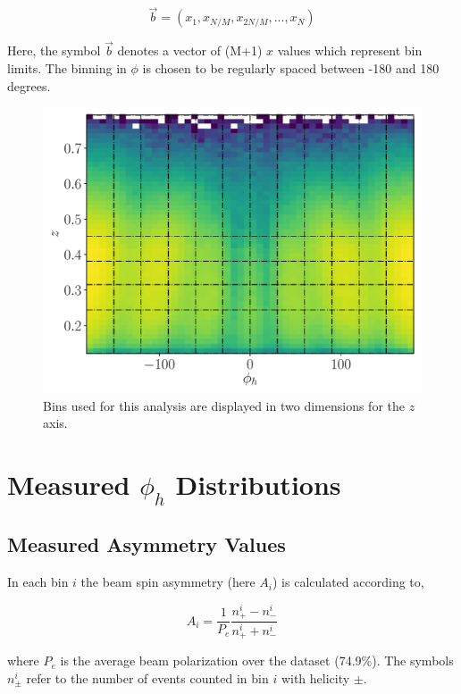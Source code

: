 \begin{equation}
  \vec{b} = (x_1, x_{N/M}, x_{2N/M}, ..., x_N)
\end{equation}

Here, the symbol $\vec{b}$ denotes a vector of (M+1) $x$ values which represent bin limits.  The binning in $\phi$ is chosen to be regularly spaced between -180 and 180 degrees.    

\begin{figure}
	\centering
	\label{fig:binning-z-phi}
	\includegraphics[width = 12cm]{image/plots/kaon-bsa/binning_z_phi.pdf}
	\caption{Bins used for this analysis are displayed in two dimensions for the $z$ axis.}
\end{figure}

\section{Measured $\phi_h$ Distributions}
\subsection{Measured Asymmetry Values}
In each bin $i$ the beam spin asymmetry (here $A_i$) is calculated according to, 

\begin{equation}
  A_i = \frac{1}{P_e} \frac{n_+^i - n_-^i}{n_+^i + n_-^i}
\end{equation}

where $P_e$ is the average beam polarization over the dataset (74.9\%).  The symbols $n_{\pm}^{i}$ refer to the number of events counted in bin $i$ with helicity $\pm$.

